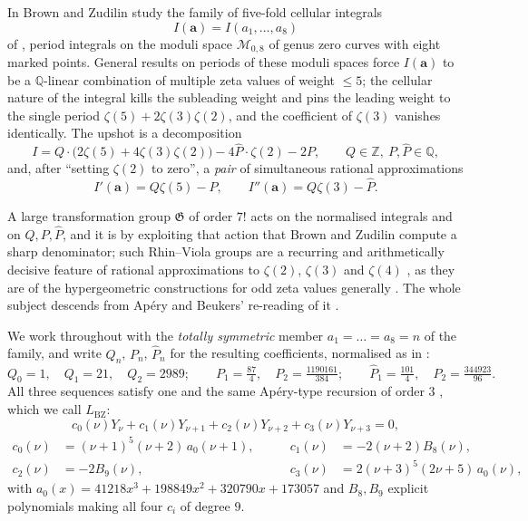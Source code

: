 \documentclass[11pt,reqno]{amsart}
\theoremstyle{plain}
\theoremstyle{definition}
\theoremstyle{remark}
\numberwithin{equation}{section}
\newcommand{\ZZ}{\mathbb{Z}}
\newcommand{\QQ}{\mathbb{Q}}
\newcommand{\LBZ}{L_{\mathrm{BZ}}}
\begin{document}
In \cite{BZ} Brown and Zudilin study the family of five-fold cellular integrals
\[
I(\boldsymbol a)=I(a_1,\dots,a_8)
\]
of \cite[Example 7.5]{Br16}, period integrals on the moduli space $\mathcal M_{0,8}$ of genus
zero curves with eight marked points. General results on periods of these moduli spaces
\cite{Br09} force $I(\boldsymbol a)$ to be a $\QQ$-linear combination of multiple zeta values
of weight $\le5$; the cellular nature of the integral kills the subleading weight and pins the
leading weight to the single period $\zeta(5)+2\zeta(3)\zeta(2)$, and the coefficient of
$\zeta(3)$ vanishes identically. The upshot \cite[(deco)]{BZ} is a decomposition
\[
I=Q\cdot\bigl(2\zeta(5)+4\zeta(3)\zeta(2)\bigr)-4\hat P\cdot\zeta(2)-2P,
\qquad Q\in\ZZ,\ P,\hat P\in\QQ,
\]
and, after ``setting $\zeta(2)$ to zero'', a \emph{pair} of simultaneous rational
approximations
\[
I'(\boldsymbol a)=Q\zeta(5)-P,\qquad I''(\boldsymbol a)=Q\zeta(3)-\hat P .
\]

A large transformation group $\mathfrak G$ of order $7!$ acts on the normalised integrals and on
$Q,P,\hat P$, and it is by exploiting that action that Brown and Zudilin compute a sharp
denominator; such Rhin--Viola groups are a recurring and arithmetically decisive feature of
rational approximations to $\zeta(2)$, $\zeta(3)$ and $\zeta(4)$ \cite{RV96,RV01,MZ20}, as they
are of the hypergeometric constructions for odd zeta values generally \cite{Zu04,Zu02a}. The
whole subject descends from Ap\'ery \cite{Ap79} and Beukers' re-reading of it \cite{Be79}.

We work throughout with the \emph{totally symmetric} member $a_1=\dots=a_8=n$ of the family,
and write $Q_n$, $P_n$, $\hat P_n$ for the resulting coefficients, normalised as in \cite{BZ}:
\begin{equation}\label{eq:normalisation}
Q_0=1,\quad Q_1=21,\quad Q_2=2989;\qquad
P_1=\tfrac{87}{4},\quad P_2=\tfrac{1190161}{384};\qquad
\hat P_1=\tfrac{101}{4},\quad \hat P_2=\tfrac{344923}{96}.
\end{equation}
All three sequences satisfy one and the same Ap\'ery-type recursion of order $3$
\cite{Zu02b}, which we call $\LBZ$:
\begin{equation}\label{eq:LBZ}
c_0(\nu)Y_\nu+c_1(\nu)Y_{\nu+1}+c_2(\nu)Y_{\nu+2}+c_3(\nu)Y_{\nu+3}=0,
\end{equation}
\begin{equation}\label{eq:LBZcoeffs}
\begin{aligned}
c_0(\nu)&=(\nu+1)^5(\nu+2)\,a_0(\nu+1), &\qquad c_1(\nu)&=-2(\nu+2)B_8(\nu),\\
c_2(\nu)&=-2B_9(\nu), &\qquad c_3(\nu)&=2(\nu+3)^5(2\nu+5)\,a_0(\nu),
\end{aligned}
\end{equation}
with $a_0(x)=41218x^3+198849x^2+320790x+173057$ and $B_8,B_9$ explicit polynomials making all
four $c_i$ of degree $9$.
\end{document}
